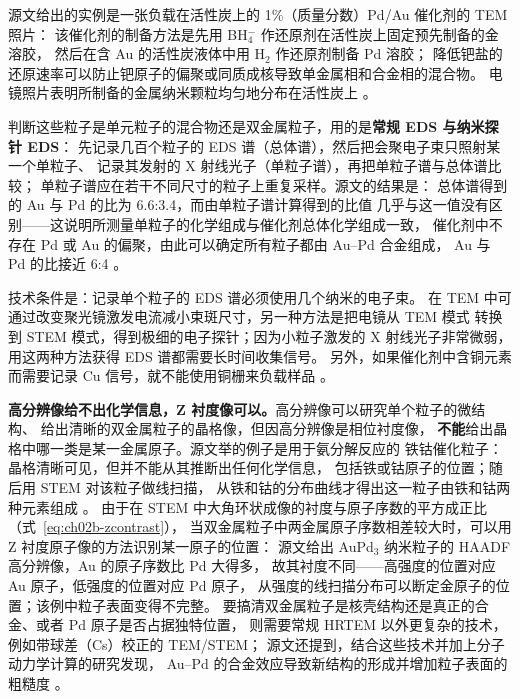 源文给出的实例是一张负载在活性炭上的 1\%（质量分数）Pd/Au 催化剂的 TEM 照片：
该催化剂的制备方法是先用 BH$_4^-$ 作还原剂在活性炭上固定预先制备的金溶胶，
然后在含 Au 的活性炭液体中用 H$_2$ 作还原剂制备 Pd 溶胶；
降低钯盐的还原速率可以防止钯原子的偏聚或同质成核导致单金属相和合金相的混合物。
电镜照片表明所制备的金属纳米颗粒均匀地分布在活性炭上
。

判断这些粒子是单元粒子的混合物还是双金属粒子，用的是\textbf{常规 EDS 与纳米探针 EDS}：
先记录几百个粒子的 EDS 谱（总体谱），然后把会聚电子束只照射某一个单粒子、
记录其发射的 X 射线光子（单粒子谱），再把单粒子谱与总体谱比较；
单粒子谱应在若干不同尺寸的粒子上重复采样。源文的结果是：
总体谱得到的 Au 与 Pd 的比为 6.6:3.4，而由单粒子谱计算得到的比值
几乎与这一值没有区别——这说明所测量单粒子的化学组成与催化剂总体化学组成一致，
催化剂中不存在 Pd 或 Au 的偏聚，由此可以确定所有粒子都由 Au--Pd 合金组成，
Au 与 Pd 的比接近 6:4
。

技术条件是：记录单个粒子的 EDS 谱必须使用几个纳米的电子束。
在 TEM 中可通过改变聚光镜激发电流减小束斑尺寸，另一种方法是把电镜从 TEM 模式
转换到 STEM 模式，得到极细的电子探针；因为小粒子激发的 X 射线光子非常微弱，
用这两种方法获得 EDS 谱都需要长时间收集信号。
另外，如果催化剂中含铜元素而需要记录 Cu 信号，就不能使用铜栅来负载样品
。

\textbf{高分辨像给不出化学信息，Z 衬度像可以。}高分辨像可以研究单个粒子的微结构、
给出清晰的双金属粒子的晶格像，但因高分辨像是相位衬度像，
\textbf{不能}给出晶格中哪一类是某一金属原子。源文举的例子是用于氨分解反应的
铁钴催化粒子：晶格清晰可见，但并不能从其推断出任何化学信息，
包括铁或钴原子的位置；随后用 STEM 对该粒子做线扫描，
从铁和钴的分布曲线才得出这一粒子由铁和钴两种元素组成
。
由于在 STEM 中大角环状成像的衬度与原子序数的平方成正比（式~\eqref{eq:ch02b-zcontrast}），
当双金属粒子中两金属原子序数相差较大时，可以用 Z 衬度原子像的方法识别某一原子的位置：
源文给出 AuPd$_3$ 纳米粒子的 HAADF 高分辨像，Au 的原子序数比 Pd 大得多，
故其衬度不同——高强度的位置对应 Au 原子，低强度的位置对应 Pd 原子，
从强度的线扫描分布可以断定金原子的位置；该例中粒子表面变得不完整。
要搞清双金属粒子是核壳结构还是真正的合金、或者 Pd 原子是否占据独特位置，
则需要常规 HRTEM 以外更复杂的技术，例如带球差（Cs）校正的 TEM/STEM；
源文还提到，结合这些技术并加上分子动力学计算的研究发现，
Au--Pd 的合金效应导致新结构的形成并增加粒子表面的粗糙度
。

